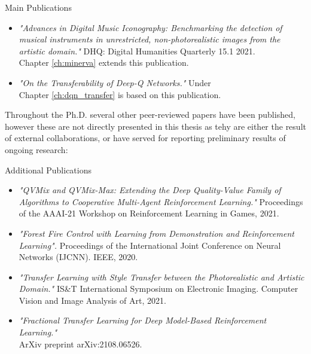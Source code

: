 \begin{remark}{Main Publications}
\begin{itemize}
	\item \citet{sabatelli2021advances} \textit{"Advances in Digital Music Iconography: Benchmarking the detection of musical instruments in unrestricted, non-photorealistic images from the artistic domain."} DHQ: Digital Humanities Quarterly 15.1 2021.
	\\ Chapter \ref{ch:minerva} extends this publication.

	\item \citet{sabatelli2021transferability} \textit{"On the Transferability of Deep-Q Networks."} Under \\
	Chapter \ref{ch:dqn_transfer} is based on this publication.
 
\end{itemize}
\end{remark}

Throughout the Ph.D. several other peer-reviewed papers have been published, however these are not directly presented in this thesis as tehy are either the result of external collaborations, or have served for reporting preliminary results of ongoing research:

\begin{takeaway}{Additional Publications}
\begin{itemize}
	\item \citet{leroy21qvmix} \textit{"QVMix and QVMix-Max: Extending the Deep Quality-Value Family of Algorithms to Cooperative Multi-Agent Reinforcement Learning."} Proceedings of the AAAI-21 Workshop on Reinforcement Learning in Games, 2021. 
	\item \citet{hammond2020forest} \textit{"Forest Fire Control with Learning from Demonstration and Reinforcement Learning".} Proceedings of the International Joint Conference on Neural Networks (IJCNN). IEEE, 2020.
	\item \citet{banartransfer} \textit{"Transfer Learning with Style Transfer between the Photorealistic and Artistic Domain."} IS\&T International Symposium on Electronic Imaging. Computer Vision and Image Analysis of Art, 2021.
	\item \citet{sasso2021fractional} \textit{"Fractional Transfer Learning for Deep Model-Based Reinforcement Learning."} \\ ArXiv preprint arXiv:2108.06526. 

\end{itemize}
\end{takeaway}
